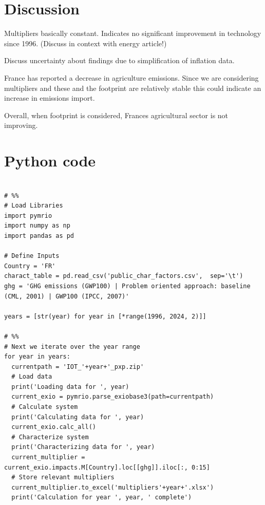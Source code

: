 \documentclass[a4paper,twoside]{article}
\begin{document}
\section{Discussion}

Multipliers basically constant. Indicates no significant improvement in technology since 1996. (Discuss in context with energy article!)

Discuss uncertainty about findings due to simplification of inflation data.

France has reported a decrease in agriculture emissions. Since we are considering multipliers and these and the footprint are relatively stable this could indicate an increase in emissions import. 

Overall, when footprint is considered, Frances agricultural sector is not improving.



\appendix

\section{Python code}

\begin{lstlisting}

# %%
# Load Libraries
import pymrio
import numpy as np
import pandas as pd

# Define Inputs
Country = 'FR'
charact_table = pd.read_csv('public_char_factors.csv',  sep='\t')
ghg = 'GHG emissions (GWP100) | Problem oriented approach: baseline (CML, 2001) | GWP100 (IPCC, 2007)'

years = [str(year) for year in [*range(1996, 2024, 2)]]

# %%
# Next we iterate over the year range
for year in years:
  currentpath = 'IOT_'+year+'_pxp.zip'
  # Load data
  print('Loading data for ', year)
  current_exio = pymrio.parse_exiobase3(path=currentpath)
  # Calculate system
  print('Calculating data for ', year)
  current_exio.calc_all()
  # Characterize system
  print('Characterizing data for ', year)
  current_multiplier = current_exio.impacts.M[Country].loc[[ghg]].iloc[:, 0:15]
  # Store relevant multipliers
  current_multiplier.to_excel('multipliers'+year+'.xlsx')
  print('Calculation for year ', year, ' complete')
  
\end{lstlisting}
\end{document}
